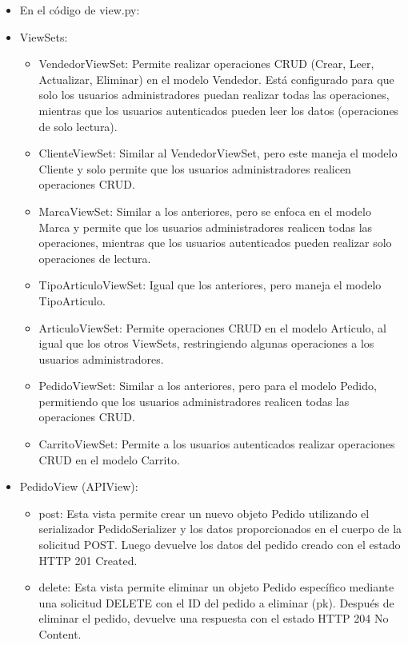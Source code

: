 \documentclass{article}
\begin{document}
    \begin{itemize}
        \item En el código de view.py:
        \item ViewSets:
        \begin{itemize}
            \item VendedorViewSet: Permite realizar operaciones CRUD (Crear, Leer, Actualizar, Eliminar) en el modelo Vendedor. Está configurado para que solo los usuarios administradores puedan realizar todas las operaciones, mientras que los usuarios autenticados pueden leer los datos (operaciones de solo lectura).
            \item ClienteViewSet: Similar al VendedorViewSet, pero este maneja el modelo Cliente y solo permite que los usuarios administradores realicen operaciones CRUD.
            \item MarcaViewSet: Similar a los anteriores, pero se enfoca en el modelo Marca y permite que los usuarios administradores realicen todas las operaciones, mientras que los usuarios autenticados pueden realizar solo operaciones de lectura.
            \item TipoArticuloViewSet: Igual que los anteriores, pero maneja el modelo TipoArticulo.
            \item ArticuloViewSet: Permite operaciones CRUD en el modelo Articulo, al igual que los otros ViewSets, restringiendo algunas operaciones a los usuarios administradores.
            \item PedidoViewSet: Similar a los anteriores, pero para el modelo Pedido, permitiendo que los usuarios administradores realicen todas las operaciones CRUD.
            \item CarritoViewSet: Permite a los usuarios autenticados realizar operaciones CRUD en el modelo Carrito.
        \end{itemize}
        \item PedidoView (APIView):
        \begin{itemize}
            \item post: Esta vista permite crear un nuevo objeto Pedido utilizando el serializador PedidoSerializer y los datos proporcionados en el cuerpo de la solicitud POST. Luego devuelve los datos del pedido creado con el estado HTTP 201 Created.
            \item delete: Esta vista permite eliminar un objeto Pedido específico mediante una solicitud DELETE con el ID del pedido a eliminar (pk). Después de eliminar el pedido, devuelve una respuesta con el estado HTTP 204 No Content.

\end{itemize}
\end{itemize}
\end{document}
